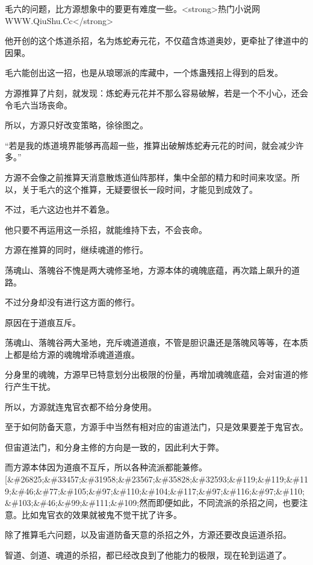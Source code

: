 
\begin{this_body}

毛六的问题，比方源想象中的要更有难度一些。<strong>热门小说网WWW.QiuShu.Cc</strong>

他开创的这个炼道杀招，名为炼蛇寿元花，不仅蕴含炼道奥妙，更牵扯了律道中的因果。

毛六能创出这一招，也是从琅琊派的库藏中，一个炼蛊残招上得到的启发。

方源推算了片刻，就发现：炼蛇寿元花并不那么容易破解，若是一个不小心，还会令毛六当场丧命。

所以，方源只好改变策略，徐徐图之。

“若是我的炼道境界能够再高超一些，推算出破解炼蛇寿元花的时间，就会减少许多。”

方源不会像之前推算天消意散炼道仙阵那样，集中全部的精力和时间来攻坚。所以，关于毛六的这个推算，无疑要很长一段时间，才能见到成效了。

不过，毛六这边也并不着急。

他只要不再运用这一杀招，就能维持下去，不会丧命。

方源在推算的同时，继续魂道的修行。

荡魂山、落魄谷不愧是两大魂修圣地，方源本体的魂魄底蕴，再次踏上飙升的道路。

不过分身却没有进行这方面的修行。

原因在于道痕互斥。

荡魂山、落魄谷两大圣地，充斥魂道道痕，不管是胆识蛊还是落魄风等等，在本质上都是给方源的魂魄增添魂道道痕。

分身里的魂魄，方源早已特意划分出极限的份量，再增加魂魄底蕴，会对宙道的修行产生干扰。

所以，方源就连鬼官衣都不给分身使用。

至于如何防备天意，方源手中当然有相对应的宙道法门，只是效果要差于鬼官衣。

但宙道法门，和分身主修的方向是一致的，因此利大于弊。

而方源本体因为道痕不互斥，所以各种流派都能兼修。[\&\#26825;\&\#33457;\&\#31958;\&\#23567;\&\#35828;\&\#32593;\&\#119;\&\#119;\&\#119;\&\#46;\&\#77;\&\#105;\&\#97;\&\#110;\&\#104;\&\#117;\&\#97;\&\#116;\&\#97;\&\#110;\&\#103;\&\#46;\&\#99;\&\#111;\&\#109;然而即便如此，不同流派的杀招之间，也要注意。比如鬼官衣的效果就被鬼不觉干扰了许多。

除了推算毛六问题，以及宙道防备天意的杀招之外，方源还要改良运道杀招。

智道、剑道、魂道的杀招，都已经改良到了他能力的极限，现在轮到运道了。


\end{this_body}

